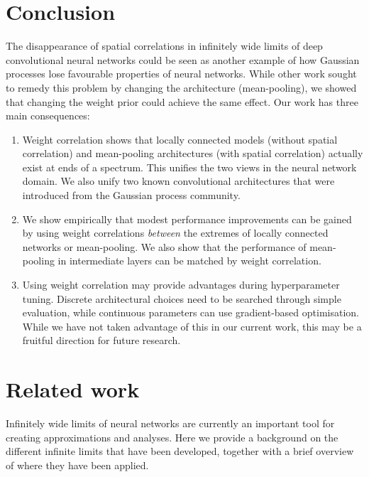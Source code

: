 \documentclass[tablecaption=bottom,wcp,nonatbib]{jmlr} %
\begin{document}
\section{Conclusion}
The disappearance of spatial correlations in infinitely wide limits of deep convolutional neural networks could be seen as another example of how Gaussian processes lose favourable properties of neural networks. While other work sought to remedy this problem by changing the architecture (mean-pooling), we showed that changing the weight prior could achieve the same effect. Our work has three main consequences:
\begin{enumerate}
    \item Weight correlation shows that locally connected models (without spatial correlation) and mean-pooling architectures (with spatial correlation) actually exist at ends of a spectrum. This unifies the two views in the neural network domain. We also unify two known convolutional architectures that were introduced from the Gaussian process community.
    \item We show empirically that modest performance improvements can be gained by using weight correlations \emph{between} the extremes of locally connected networks or mean-pooling. We also show that the performance of mean-pooling in intermediate layers can be matched by weight correlation.
    \item Using weight correlation may provide advantages during hyperparameter tuning. Discrete architectural choices need to be searched through simple evaluation, while continuous parameters can use gradient-based optimisation. While we have not taken advantage of this in our current work, this may be a fruitful direction for future research.
\end{enumerate}











\newpage
\appendix
\section{Related work}
Infinitely wide limits of neural networks are currently an important tool for creating approximations and analyses. Here we provide a background on the different infinite limits that have been developed, together with a brief overview of where they have been applied.
\end{document}
